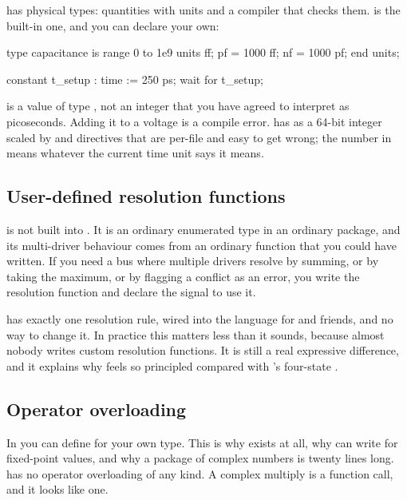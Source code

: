 \VHDL{} has physical types: quantities with units and a compiler that checks
them.  is the built-in one, and you can declare your own:

\begin{vhdlcode}
type capacitance is range 0 to 1e9
  units
    ff;  pf = 1000 ff;  nf = 1000 pf;
  end units;

constant t_setup : time := 250 ps;
wait for t_setup;
\end{vhdlcode}

 is a value of type , not an integer that you have
agreed to interpret as picoseconds. Adding it to a voltage is a compile error.
\SV{} has  as a 64-bit integer scaled by  and
 directives that are per-file and easy to get wrong; the
number  in  means whatever the current time unit says it
means.

\subsection{User-defined resolution functions}

 is not built into \VHDL{}. It is an ordinary enumerated type
in an ordinary package, and its multi-driver behaviour comes from an ordinary
function that you could have written. If you need a bus where multiple drivers
resolve by summing, or by taking the maximum, or by flagging a conflict as an
error, you write the resolution function and declare the signal to use it.

\SV{} has exactly one resolution rule, wired into the language for 
and friends, and no way to change it. In practice this matters less than it
sounds, because almost nobody writes custom resolution functions. It is still
a real expressive difference, and it explains why  feels so
principled compared with \SV{}'s four-state .

\subsection{Operator overloading}

In \VHDL{} you can define  for your own type. This is why
 exists at all, why  can write 
for fixed-point values, and why a package of complex numbers is twenty lines
long. \SV{} has no operator overloading of any kind. A complex multiply is a
function call, and it looks like one.

